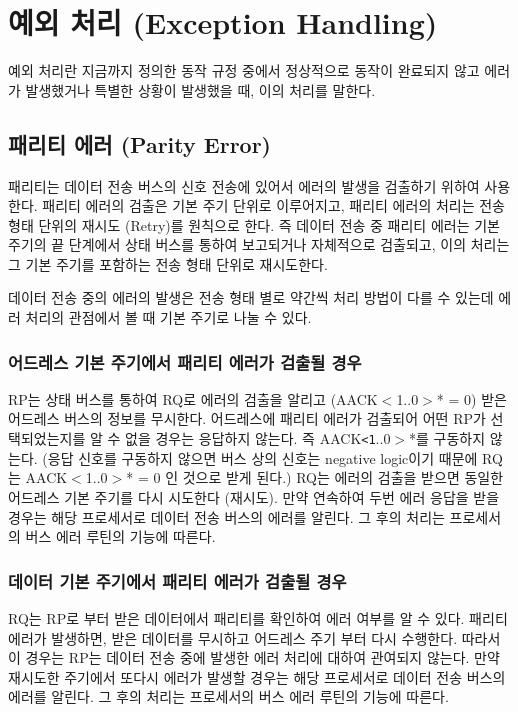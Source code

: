%
%
\section{예외 처리 (Exception Handling)}
예외 처리란 지금까지 정의한 동작 규정 중에서 정상적으로 동작이 완료되지 않고
에러가 발생했거나 특별한 상황이 발생했을 때, 이의 처리를 말한다. 

\subsection{패리티 에러 (Parity Error)}
패리티는 데이터 전송 버스의 신호 전송에 있어서 에러의 발생을 검출하기 위하여 사용한다.
패리티 에러의 검출은 기본 주기 단위로 이루어지고,
패리티 에러의 처리는 전송 형태 단위의 재시도 (Retry)를 원칙으로 한다.
즉 데이터 전송 중 패리티 에러는 기본 주기의 끝 단계에서 상태 버스를 통하여 보고되거나
자체적으로 검출되고, 이의 처리는 그 기본 주기를 포함하는 전송 형태 단위로 재시도한다.

데이터 전송 중의 에러의 발생은 전송 형태 별로 약간씩 처리 방법이 다를 수 있는데
에러 처리의 관점에서 볼 때 기본 주기로 나눌 수 있다.

\subsubsection{어드레스 기본 주기에서 패리티 에러가 검출될 경우}
RP는 상태 버스를 통하여 RQ로 에러의 검출을 알리고 (AACK$<$1..0$>$* = 0)
받은 어드레스 버스의 정보를 무시한다. 어드레스에 패리티 에러가 검출되어 어떤 RP가 
선택되었는지를 알 수 없을 경우는 응답하지 않는다. 즉 AACK{\tt <1}..0$>$*를 구동하지 않는다.
(응답 신호를 구동하지 않으면 버스 상의 신호는 negative logic이기 때문에
RQ는 AACK$<$1..0$>$* = 0 인 것으로 받게 된다.)
RQ는 에러의 검출을 받으면 동일한 어드레스 기본 주기를 다시 시도한다 (재시도).
만약 연속하여 두번 에러 응답을 받을 경우는 해당 프로세서로 데이터 전송 버스의 에러를 알린다.
그 후의 처리는 프로세서의 버스 에러 루틴의 기능에 따른다.

\subsubsection{데이터 기본 주기에서 패리티 에러가 검출될 경우}
RQ는 RP로 부터 받은 데이터에서 패리티를 확인하여 에러 여부를 알 수 있다.
패리티 에러가 발생하면, 받은 데이터를 무시하고 어드레스 주기 부터 다시 수행한다.
따라서 이 경우는 RP는 데이터 전송 중에 발생한 에러 처리에 대하여 관여되지 않는다.
만약 재시도한 주기에서 또다시 에러가 발생할 경우는 해당 프로세서로 데이터 전송 버스의 에러를 알린다.
그 후의 처리는 프로세서의 버스 에러 루틴의 기능에 따른다.


